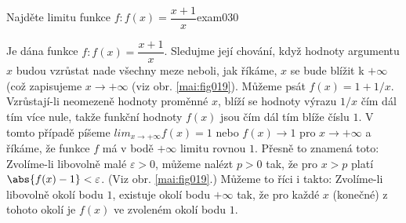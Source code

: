 \begin{mathexam}{Najděte limitu funkce \(f: f(x) = \dfrac{x + 1}{x}\)}{exam030} 
  
  Je dána funkce \(f: f(x) = \dfrac{x + 1}{x}\). Sledujme její chování, když hodnoty argumentu \(x\)
  budou vzrůstat nade všechny meze neboli, jak říkáme, \(x\) se bude blížit k \(+\infty\) (což
  zapisujeme \(x \to + \infty\) (viz obr. \ref{mai:fig019}). Můžeme psát \(f(x) = 1 + 1/x\).
  Vzrůstají-li neomezeně hodnoty proměnné \(x\), blíží se hodnoty výrazu \(1/x\) čím dál tím více
  nule, takže funkční hodnoty \(f(x)\) jsou čím dál tím blíže číslu \(1\). V tomto případě píšeme
  \(lim_{x\to+\infty} f(x) = 1\) nebo \(f(x) \to 1\) pro \(x\to +\infty\) a říkáme, že funkce \(f\)
  má v bodě \(+\infty\) limitu rovnou \(1\). Přesně to znamená toto: Zvolíme-li libovolně malé
  \(\varepsilon > 0\), můžeme nalézt \(p > 0\) tak, že pro \(x > p\) platí \(\abs{f(x) - 1} <
  \varepsilon\). (Viz obr. \ref{mai:fig019}.) Můžeme to říci i takto: Zvolíme-li libovolně okolí
  bodu \(1\), existuje okolí bodu \(+\infty\) tak, že pro každé \(x\) (konečné) z tohoto okolí je
  \(f(x)\) ve zvoleném okolí bodu \(1\).
  
  {\centering
  \captionsetup{type=figure}
%   
  \par}
\end{mathexam}